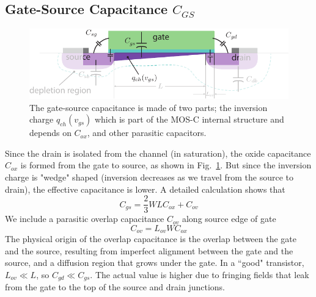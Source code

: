 \subsection{Gate-Source Capacitance \texorpdfstring{$C_{GS}$}{}}
\begin{figure}[tb]
\centering
\includegraphics[width=.75\columnwidth]{mos_caps_Cgs}
\caption{The gate-source capacitance is made of two parts; the inversion charge $q_{ch}(v_{gs})$ which is part of the MOS-C internal structure and depends on $C_{ox}$, and other parasitic capacitors.} \label{fig:mos_caps_Cgs}
\end{figure}
Since the drain is isolated from the channel (in saturation), the oxide capacitance $C_{ox}$ is formed from the gate to source, as shown in Fig.~\ref{fig:mos_caps_Cgs}.  But since the inversion charge is "wedge" shaped (inversion decreases as we travel from the source to drain), the effective capacitance is lower.  A detailed calculation shows that
    \begin{equation}
        C_{gs} = \frac{2}{3} W L C_{ox} + C_{ov} 
    \end{equation} 
We include a parasitic overlap capacitance $C_{ov}$ along source edge of gate 
    \begin{equation}
        C_{ov} = L_{ov} W C_{ox}
    \end{equation}
The physical origin of the overlap capacitance is the overlap between the gate and the source, resulting from imperfect alignment between the gate and the source, and a diffusion region that grows under the gate.   In a ``good" transistor, $L_{ov} \ll L$, so $C_{gd} \ll C_{gs}$.  The actual value is higher due to fringing fields that leak from the gate to the top of the source and drain junctions.

